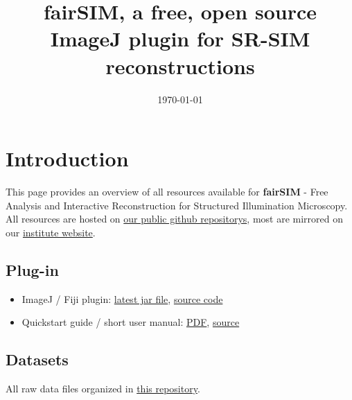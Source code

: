 \documentclass[twoside=false,
           a4paper,
           10pt,DIV=16,parindent=none,parskip=half]{article}
\title{fairSIM, a free, open source ImageJ plugin for SR-SIM reconstructions}
\date{\small \today}
\begin{document}
\maketitle


\section*{Introduction}
This page provides an overview of all resources available
for \textbf{fairSIM}  - Free Analysis and Interactive Reconstruction for Structured Illumination Microscopy.
\\
All resources are hosted on \href{https://github.com/fairSIM}{our public github repositorys},
most are mirrored on our \href{http://www.physik.uni-bielefeld.de/fairsim}{institute website}.

\subsection*{Plug-in}
\begin{itemize}
\item 
ImageJ / Fiji plugin:
\href{https://github.com/fairSIM/fairSIM/releases/latest}{latest jar file},
\href{https://github.com/fairSIM/fairSIM/}{source code}
\item
Quickstart guide / short user manual:
\href{https://github.com/fairSIM/documentation/releases/latest}{PDF},
\href{https://github.com/fairSIM/documentation}{source}
\end{itemize}


\subsection*{Datasets}

All raw data files organized in \href{https://github.com/fairSIM/test-datasets}{this repository}.
\end{document}
